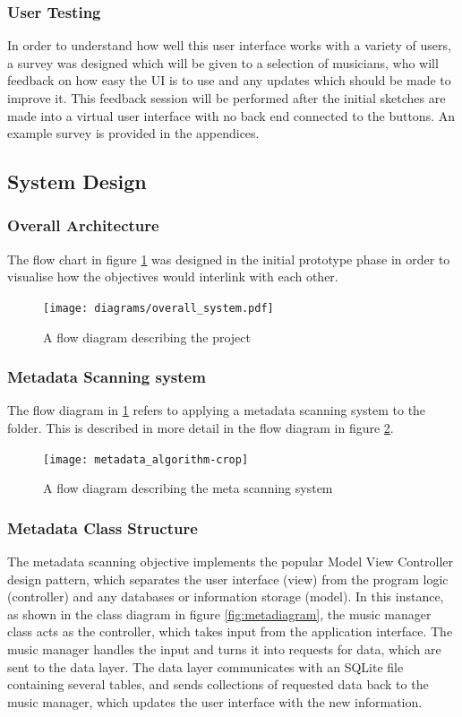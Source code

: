 \subsubsection{User Testing}
In order to understand how well this user interface works with a variety of users, a survey was designed which will be given to a selection of musicians, who will feedback on how easy the UI is to use and any updates which should be made to improve it. This feedback session will be performed after the initial sketches are made into a virtual user interface with no back end connected to the buttons. An example survey is provided in the appendices.

\subsection{System Design}
\subsubsection{Overall Architecture}
The flow chart in figure \ref{fig:flowchart} was designed in the initial prototype phase in order to visualise how the objectives would interlink with each other.
\begin{figure}[H]
    \centering
    \texttt{[image: diagrams/overall\_system.pdf]}
    \caption{A flow diagram describing the project}
    \label{fig:flowchart}
\end{figure}

\subsubsection{Metadata Scanning system}
The flow diagram in \ref{fig:flowchart} refers to applying a metadata scanning system to the folder. This is described in more detail in the flow diagram in figure \ref{fig:meta}. 
\begin{figure}[H]
    \centering
    \texttt{[image: metadata\_algorithm-crop]}
    \caption{A flow diagram describing the meta scanning system}
    \label{fig:meta}
\end{figure}
\subsubsection{Metadata Class Structure}
The metadata scanning objective implements the popular Model View Controller design pattern, which separates the user interface (view) from the program logic (controller) and any databases or information storage (model). %
In this instance, as shown in the class diagram in figure \ref{fig:metadiagram}, the music manager class acts as the controller, which takes input from the application interface. The music manager handles the input and turns it into requests for data, which are sent to the data layer. The data layer communicates with an SQLite file containing several tables, and sends collections of requested data back to the music manager, which updates the user interface with the new information.

